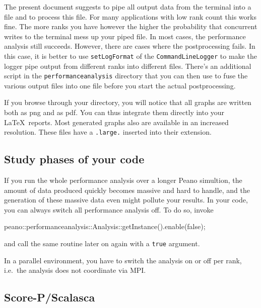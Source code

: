 \begin{remark}
The present document suggests to pipe all output data from the terminal into a
file and to process this file. 
For many applications with low rank count this works fine.
The more ranks you have however the higher the probability that concurrent
writes to the terminal mess up your piped file.
In most cases, the performance analysis still succeeds. 
However, there are cases where the postprocessing fails.
In this case, it is better to use \texttt{setLogFormat} of the
\texttt{CommandLineLogger} to make the logger pipe output from different ranks
into different files.
There's an additional script in the \texttt{performanceanalysis} directory that
you can then use to fuse the various output files into one file before you start
the actual postprocessing.
\end{remark}



\noindent
If you browse through your directory, you will notice that all graphs are
written both as png and as pdf. 
You can thus integrate them directly into your \LaTeX\ reports.
Most generated graphs also are available in an increased resolution. 
These files have a \texttt{.large.} inserted into their extension.


\subsection*{Study phases of your code}

If you run the whole performance analysis over a longer Peano simultion, the
amount of data produced quickly becomes massive and hard to handle, and the generation of
these massive data even might pollute your results. 
In your code, you can always switch all performance analysis off. 
To do so, invoke
\begin{code}
  peano::performanceanalysis::Analysis::getInstance().enable(false);
\end{code}

\noindent
and call the same routine later on again with a \texttt{true} argument.

In a parallel environment, you have to switch the analysis on or off per rank,
i.e.~the analysis does not coordinate via MPI. 

\subsection*{Score-P/Scalasca}

